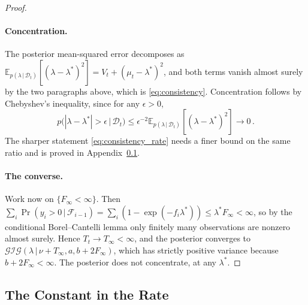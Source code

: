 \documentclass[twoside]{article}
\newcommand\given[1][]{\,#1\vert\,}
\providecommand{\Ex}[2]{\mathbb{E}_{#1}\!\left[#2\right]}
\providecommand{\Gig}{\mathcal{GIG}}  %
\theoremstyle{plain}
\theoremstyle{definition}
\theoremstyle{remark}
\begin{document}
\begin{proof}
    \paragraph{Concentration.}
    The posterior mean-squared error decomposes as $\Ex{p(\lambda \given \mathcal{D}_t)}{(\lambda - \lambda^{*})^{2}} = V_t + (\mu_t - \lambda^{*})^{2}$, and both terms vanish almost surely by the two paragraphs above, which is \eqref{eq:consistency}.
    Concentration follows by Chebyshev's inequality, since for any $\epsilon > 0$,
    \begin{equation*}
        p\big( |\lambda - \lambda^{*}| > \epsilon \given \mathcal{D}_t \big) \leq \epsilon^{-2} \Ex{p(\lambda \given \mathcal{D}_t)}{(\lambda - \lambda^{*})^{2}} \longrightarrow 0 \,.
    \end{equation*}
    The sharper statement \eqref{eq:consistency_rate} needs a finer bound on the same ratio and is proved in Appendix~\ref{appx:consistency_constant}.

    \paragraph{The converse.}
    Work now on $\{F_{\infty} < \infty\}$.
    Then $\sum_{i} \Pr(y_i > 0 \given \mathcal{F}_{i-1}) = \sum_{i} (1 - \exp(-f_i \lambda^{*})) \leq \lambda^{*} F_{\infty} < \infty$, so by the conditional Borel--Cantelli lemma only finitely many observations are nonzero almost surely.
    Hence $T_t \to T_{\infty} < \infty$, and the posterior converges to $\Gig(\lambda \given \nu + T_{\infty}, a, b + 2 F_{\infty})$, which has strictly positive variance because $b + 2F_\infty < \infty$.
    The posterior does not concentrate, at any $\lambda^{*}$.
\end{proof}

\subsection{The Constant in the Rate}
\label{appx:consistency_constant}
\end{document}
